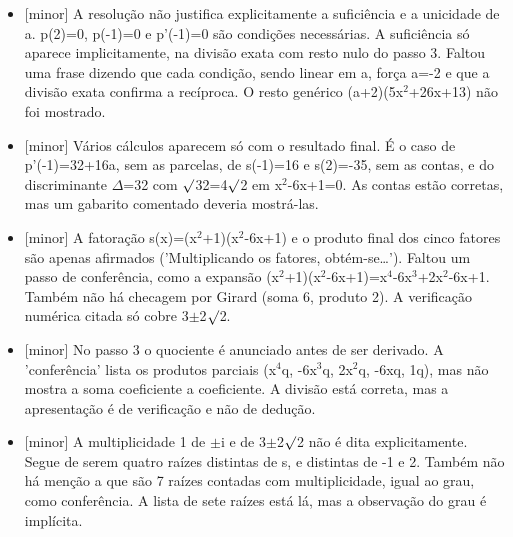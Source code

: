 \documentclass{article}%
\begin{document}
\begin{itemize}%
\item%
{[}minor{]} A resolução não justifica explicitamente a suficiência e a unicidade de a. p(2)=0, p({-}1)=0 e p'({-}1)=0 são condições necessárias. A suficiência só aparece implicitamente, na divisão exata com resto nulo do passo 3. Faltou uma frase dizendo que cada condição, sendo linear em a, força a={-}2 e que a divisão exata confirma a recíproca. O resto genérico (a+2)(5x$^2$+26x+13) não foi mostrado.%
\item%
{[}minor{]} Vários cálculos aparecem só com o resultado final. É o caso de p'({-}1)=32+16a, sem as parcelas, de s({-}1)=16 e s(2)={-}35, sem as contas, e do discriminante $\Delta$=32 com $\surd$32=4$\surd$2 em x$^2${-}6x+1=0. As contas estão corretas, mas um gabarito comentado deveria mostrá{-}las.%
\item%
{[}minor{]} A fatoração s(x)=(x$^2$+1)(x$^2${-}6x+1) e o produto final dos cinco fatores são apenas afirmados ('Multiplicando os fatores, obtém{-}se\ldots{}'). Faltou um passo de conferência, como a expansão (x$^2$+1)(x$^2${-}6x+1)=x$^{4}${-}6x$^3$+2x$^2${-}6x+1. Também não há checagem por Girard (soma 6, produto 2). A verificação numérica citada só cobre 3$\pm$2$\surd$2.%
\item%
{[}minor{]} No passo 3 o quociente é anunciado antes de ser derivado. A 'conferência' lista os produtos parciais (x$^{4}$q, {-}6x$^3$q, 2x$^2$q, {-}6xq, 1q), mas não mostra a soma coeficiente a coeficiente. A divisão está correta, mas a apresentação é de verificação e não de dedução.%
\item%
{[}minor{]} A multiplicidade 1 de $\pm$i e de 3$\pm$2$\surd$2 não é dita explicitamente. Segue de serem quatro raízes distintas de s, e distintas de {-}1 e 2. Também não há menção a que são 7 raízes contadas com multiplicidade, igual ao grau, como conferência. A lista de sete raízes está lá, mas a observação do grau é implícita.%
\end{itemize}%
\end{document}
